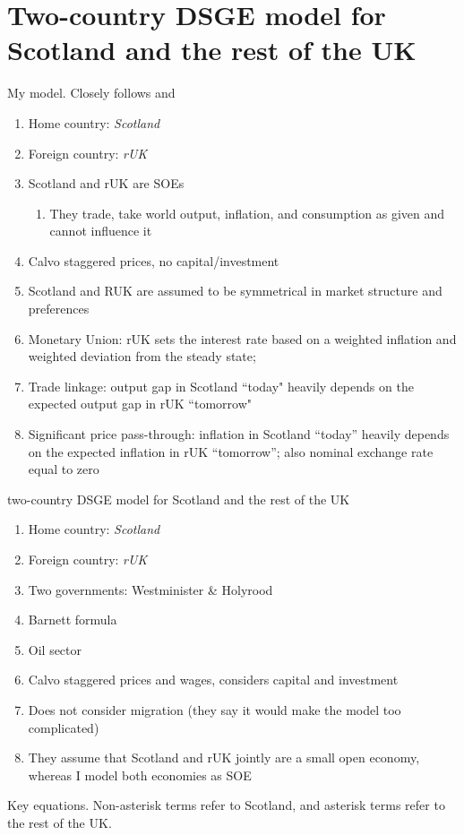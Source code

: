 \section*{Two-country DSGE model for Scotland and the rest of the UK}

My model. Closely follows \textcite{jordigal_2015_monetary} and \textcite{gali_2005_monetary}
\begin{enumerate}
    \item Home country: \textit{Scotland}
    \item  Foreign country: \textit{rUK}
    \item  Scotland and rUK are SOEs
          \begin{enumerate}
              \item They trade, take world output, inflation, and consumption as given and cannot influence it
          \end{enumerate}
    \item Calvo staggered prices, no capital/investment
    \item Scotland and RUK are assumed to be symmetrical in market structure and preferences
    \item Monetary Union: rUK sets the interest rate based on a weighted inflation and weighted deviation from the steady state;
    \item Trade linkage: output gap in Scotland ``today" heavily depends on the expected output gap in rUK ``tomorrow"
    \item Significant price pass-through: inflation in Scotland ``today'' heavily depends on the expected inflation in rUK ``tomorrow''; also nominal exchange rate equal to zero
\end{enumerate}

\textcite{ricci_2019_essays} two-country DSGE model for Scotland and the rest of the UK
\begin{enumerate}
    \item Home country: \textit{Scotland}
    \item  Foreign country: \textit{rUK}
    \item Two governments: Westminister \& Holyrood
    \item Barnett formula
    \item Oil sector
    \item Calvo staggered prices and wages, considers capital and investment
    \item Does not consider migration (they say it would make the model too complicated)
    \item They assume that Scotland and rUK jointly are a small open economy, whereas I model both economies as SOE
\end{enumerate}
\pagebreak
Key equations. Non-asterisk terms refer to Scotland, and asterisk terms refer to the rest of the UK. \\

